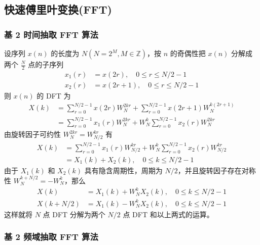 \documentclass[12pt,AutoFakeBold]{article}
\begin{document}
\subsection{快速傅里叶变换(FFT)}

\subsubsection{基 2 时间抽取 FFT 算法}

设序列 $x(n)$ 的长度为 $N(N=2^M, M\in\mathbb{Z})$，按 $n$ 的奇偶性把 $x(n)$ 分解成两个 $\frac{N}{2}$ 点的子序列
%
\begin{align*}
x_1(r) &= x(2r),\quad 0\le r\le N/2-1 \\
x_2(r) &= x(2r+1), \quad 0\le r\le N/2-1
\end{align*}
%
则 $x(n)$ 的 DFT 为
\begin{align*}
X(k) &= \sum_{r=0}^{N/2-1}x(2r)W_N^{2kr}+\sum_{r=0}^{N/2-1}x(2r+1)W_N^{k(2r+1)} \\
     &= \sum_{r=0}^{N/2-1}x_1(r)W_N^{2kr}+W_N^k\sum_{r=0}^{N/2-1}x_2(r)W_N^{2kr}
\end{align*}
%
由旋转因子可约性 $W_N^{2kr}=W_{N/2}^{kr}$ 有
%
\begin{align*}
X(k) &= \sum_{r=0}^{N/2-1}x_1(r)W_{N/2}^{kr}+W_N^k\sum_{r=0}^{N/2-1}x_2(r)W_{N/2}^{kr} \\
     &= X_1(k)+X_2(k),\quad 0\le k\le N/2-1
\end{align*}
%
由于 $X_1(k)$ 和 $X_2(k)$ 具有隐含周期性，周期为 $N/2$，并且旋转因子存在对称性 $W_N^{k+N/2}=-W_N^k$，那么
%
\begin{align*}
X(k) &= X_1(k)+W_N^kX_2(k),\quad 0\le k\le N/2-1 \\
X(k+N/2) &= X_1(k)-W_N^kX_2(k),\quad 0\le k\le N/2-1 
\end{align*}
%
这样就将 $N$ 点 DFT 分解为两个 $N/2$ 点 DFT 和以上两式的运算。
 
\subsubsection{基 2 频域抽取 FFT 算法}
\end{document}
